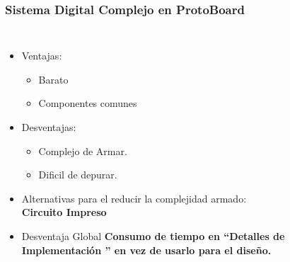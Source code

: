 \frame
{
	\frametitle{Sistema Digital Complejo en ProtoBoard}
  \begin{columns}
  	\begin{itemize}
  	\item Ventajas:  %
	  	\begin{itemize}
  		\item Barato  %
  		\item Componentes comunes  %
  		\end{itemize}  	
  	\item Desventajas: %
	  	\begin{itemize}
	  	\item Complejo de Armar. %
  		\item Dificil de depurar. %
  		\end{itemize}  
  		\item Alternativas para el reducir la complejidad armado: \textbf{Circuito Impreso} %
  		\item Desventaja Global \textbf{Consumo de tiempo en ``Detalles de Implementaci\'on '' en vez de usarlo para el dise\~no. } %
  	
  	\end{itemize}

  \begin{center}
		\begin{figure}      
		 \end{figure}	
		 \end{center}
	\end{columns}

}

